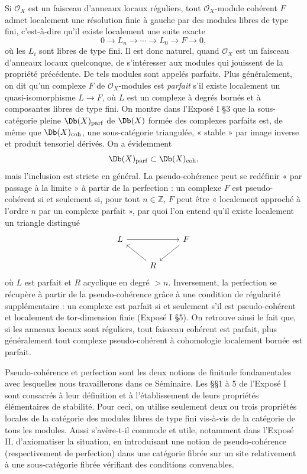 \documentclass[11pt]{article}
\begin{document}
Si \(\mathcal O_X\) est un faisceau d'anneaux locaux réguliers, tout \(\mathcal O_X\)-module cohérent \(F\) admet localement une résolution finie à gauche par des modules libres de type fini, c'est-à-dire qu'il existe localement une suite exacte
\[
  0\longrightarrow L_n\longrightarrow \cdots \longrightarrow L_0\longrightarrow F\longrightarrow 0,
\]
où les \(L_i\) sont libres de type fini. Il est donc naturel, quand \(\mathcal O_X\) est un faisceau d'anneaux locaux quelconque, de s'intéresser aux modules qui jouissent de la propriété précédente. De tels modules sont appelés parfaits. Plus généralement, on dit qu'un complexe \(F\) de \(\mathcal O_X\)-modules est \emph{parfait} s'il existe localement un quasi-isomorphisme \(L\to F\), où \(L\) est un complexe à degrés bornés et à composantes libres de type fini. On montre dans l'Exposé I §3 que la sous-catégorie pleine \(\Db(X)_{\mathrm{parf}}\) de \(\Db(X)\) formée des complexes parfaits est, de même que \(\Db(X)_{\mathrm{coh}}\), une sous-catégorie triangulée, « stable » par image inverse et produit tensoriel dérivés. On a évidemment
\[
  \Db(X)_{\mathrm{parf}}\subset\Db(X)_{\mathrm{coh}},
\]
mais l'inclusion est stricte en général. La pseudo-cohérence peut se redéfinir « par passage à la limite » à partir de la perfection : un complexe \(F\) est pseudo-cohérent si et seulement si, pour tout \(n\in\mathbb Z\), \(F\) peut être « localement approché à l'ordre \(n\) par un complexe parfait », par quoi l'on entend qu'il existe localement un triangle distingué
\[
\begin{tikzcd}
L \arrow[rr] && F \arrow[dl]\\
& R \arrow[ul] &
\end{tikzcd}
\]
où \(L\) est parfait et \(R\) acyclique en degré \(>n\). Inversement, la perfection se récupère à partir de la pseudo-cohérence grâce à une condition de régularité supplémentaire : un complexe est parfait si et seulement s'il est pseudo-cohérent et localement de tor-dimension finie (Exposé I §5). On retrouve ainsi le fait que, si les anneaux locaux sont réguliers, tout faisceau cohérent est parfait, plus généralement tout complexe pseudo-cohérent à cohomologie localement bornée est parfait.

Pseudo-cohérence et perfection sont les deux notions de finitude fondamentales avec lesquelles nous travaillerons dans ce Séminaire. Les §§1 à 5 de l'Exposé I sont consacrés à leur définition et à l'établissement de leurs propriétés élémentaires de stabilité. Pour ceci, on utilise seulement deux ou trois propriétés locales de la catégorie des modules libres de type fini vis-à-vis de la catégorie de tous les modules. Aussi s'avère-t-il commode et utile, notamment dans l'Exposé II, d'axiomatiser la situation, en introduisant une notion de pseudo-cohérence (respectivement de perfection) dans une catégorie fibrée sur un site relativement à une sous-catégorie fibrée vérifiant des conditions convenables.
\end{document}

